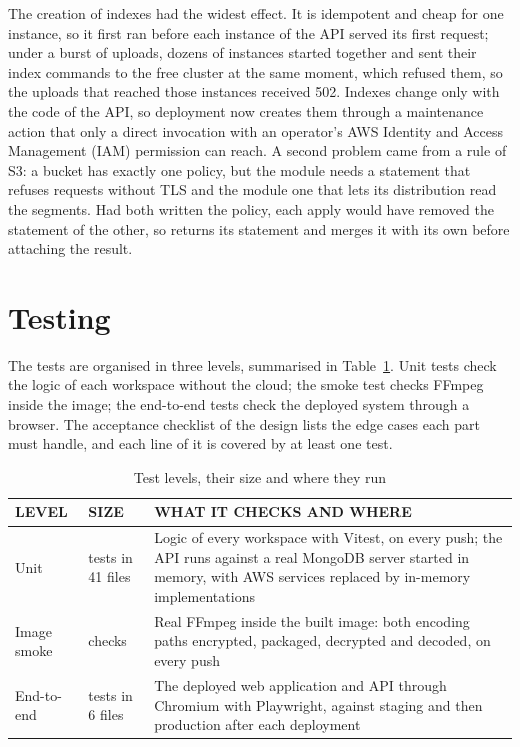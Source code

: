 The creation of indexes had the widest effect. It is idempotent and cheap for one instance, so it
first ran before each instance of the API served its first request; under a burst of uploads, dozens
of instances started together and sent their index commands to the free cluster at the same moment,
which refused them, so the uploads that reached those instances received 502. Indexes change only
with the code of the API, so deployment now creates them through a maintenance action that only a
direct invocation with an operator's AWS Identity and Access Management (IAM) permission can reach.
A second problem came from a rule of S3: a bucket has exactly one policy, but the 
module needs a statement that refuses requests without TLS and the  module one that lets
its distribution read the segments. Had both written the policy, each apply would have removed the
statement of the other, so  returns its statement and  merges it with its own
before attaching the result.

\section{Testing}
\label{sec:testing}

The tests are organised in three levels, summarised in Table~\ref{tab:test-levels}. Unit tests check
the logic of each workspace without the cloud; the smoke test checks FFmpeg inside the image; the
end-to-end tests check the deployed system through a browser. The acceptance checklist of the design
lists the edge cases each part must handle, and each line of it is covered by at least one test.

\begin{table}[htbp]
\centering
\caption{Test levels, their size and where they run}
\label{tab:test-levels}
\small
\begin{tabularx}{\textwidth}{>{\raggedright\arraybackslash}p{} >{\raggedright\arraybackslash}p{} >{\raggedright\arraybackslash}X}
\toprule
\textbf{LEVEL} & \textbf{SIZE} & \textbf{WHAT IT CHECKS AND WHERE} \\
\midrule
Unit & 380 tests in 41 files & Logic of every workspace with Vitest, on every push; the API runs against a real MongoDB server started in memory, with AWS services replaced by in-memory implementations \\
Image smoke & 13 checks & Real FFmpeg inside the built image: both encoding paths encrypted, packaged, decrypted and decoded, on every push \\
End-to-end & 27 tests in 6 files & The deployed web application and API through Chromium with Playwright, against staging and then production after each deployment \\
\bottomrule
\end{tabularx}
\end{table}


